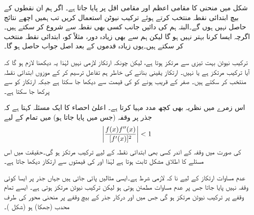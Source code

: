 شکل  میں منحنی کا مقامی اعظم  اور مقامی اقل  پر پایا جاتا ہے۔ اگر ہم ان نقطوں کے بیچ ابتدائی نقطہ منتخب کرتے ہوئے ترکیب نیوٹن استعمال کریں تب ہمیں اچھے نتائج حاصل نہیں ہوں گے۔البتہ ہم  کی  دائیں جانب کسی بھی نقطہ سے شروع کر سکتے ہیں۔ اگرچہ ایسا کرنا بہتر نہیں ہو گا لیکن ہم  سے بھی زیادہ دور، مثلاً  کو، ابتدائی نقطہ منتخب کر سکتے ہیں۔یوں زیادہ قدموں کے بعد اصل جواب حاصل ہو گا۔

ترکیب نیوٹن بہت تیزی سے مرتکز ہوتا ہے، لیکن چونکہ ارتکاز لازمی نہیں  لہٰذا یہ دیکھنا لازم  ہو گا کہ آیا ترکیب مرتکز ہے یا نہیں۔ ارتکاز یقینی بنانے کی خاطر ہم تفاعل ترسیم کر کے موزوں ابتدائی نقطہ  منتخب کر سکتے ہیں۔ صفر کے قریب ہونے کو  کی قیمت سے دیکھا جا سکتا ہے جبکہ ارتکاز کو  سے پرکھا جا سکتا ہے۔

اس زمرے میں نظریہ بھی کچھ مدد مہیا کرتا ہے۔ اعلیٰ احصاء کا ایک مسئلہ کہتا ہے کہ جذر  پر وقفہ (جس میں  پایا جاتا ہو) میں تمام  کے لیے
\begin{align}\label{مساوات_استعمال_مرکوزیت_نیوٹن_الف}
\abs{\frac{f(x)f''(x)}{[f'(x)]^2}}<1
\end{align}
کی صورت میں  وقفہ کے اندر کسی بھی ابتدائی نقطہ  کے لیے ترکیب مرتکز ہو گی۔حقیقت میں اس مسئلے کا اطلاق مشکل ثابت ہوتا ہے لہٰذا  اور  کی قیمتوں سے ارتکاز دیکھا جاتا ہے۔

عدم مساوات  ارتکاز کے لیے  نا کہ لازمی شرط ہے۔ایسی مثالیں پائی جاتی ہیں جہاں جذر  پر ایسا کوئی وقفہ نہیں پایا جاتا   جس پر عدم مساوات  مطمئن ہوتی ہو لیکن ترکیب نیوٹن مرتکز ہوتی ہے۔ ایسے تمام وقفے پر ترکیب نیوٹن مرتکز ہو گی جس میں  اور درکار جذر کے بیچ وقفے پر منحنی  محور  کی طرف محدب (جھکا) ہو (شکل )۔

